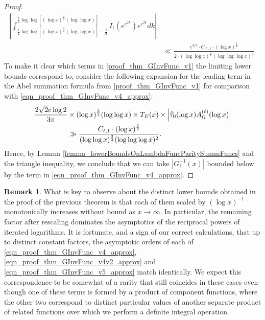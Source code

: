 \documentclass[11pt,reqno,a4letter]{article}
\numberwithin{figure}{section}
\numberwithin{table}{section}
\theoremstyle{plain}
\numberwithin{theorem}{section}
\theoremstyle{definition}
\newtheorem{remark}[theorem]{Remark}
\begin{document}
\begin{proof}
\begin{align}
     \left\lvert 
     \int_{\frac{1}{2} \log\log\left[(\log x)^{\frac{3}{2}} (\log\log x)\right] - 
     \frac{1}{2}}^{\frac{1}{2} \log\log\left[(\log x)^{\frac{3}{2}} (\log\log x)\right]} 
     I_{\ell}\left(e^{e^{2k}}\right) 
     e^{e^{2k}} dk \right\rvert \\ 
\label{eqn_proof_thm_GInvFunc_v4v2_approx} 
     & \ll 
     \frac{e^{3/4} \cdot C_{\ell,1} \cdot (\log x)^{\frac{3}{2}}}{2 \cdot  
     (\log\log x)^{\frac{3}{4}} (\log\log\log x)^2}. 
\end{align} 
To make it clear which terms in \eqref{proof_thm_GInvFunc_v1} 
the limiting lower bounds correspond to, consider the following expansion for the leading term in 
the Abel summation formula from \eqref{proof_thm_GInvFunc_v1} for comparison with 
\eqref{eqn_proof_thm_GInvFunc_v4_approx}: 
\begin{align} 
\notag 
\frac{2\sqrt{2} e \log 2}{3\pi} & \times (\log x)^{\frac{3}{2}} (\log\log x) \times T_E(x) \times 
     \left\lvert \widehat{\tau}_0(\log x) A_{\Omega}^{(\ell)}(\log x) \right\rvert \\ 
\label{eqn_proof_thm_GInvFunc_v5_approx} 
     & \gg \frac{C_{\ell,1} \cdot (\log x)^{\frac{3}{2}}}{ 
     (\log\log x)^{\frac{3}{4}} (\log\log\log x)^2}. 
\end{align} 
Hence, by 
Lemma \ref{lemma_lowerBoundsOnLambdaFuncParitySummFuncs} and the triangle inequality, 
we conclude that we can take $\left\lvert G_{\ell}^{-1}\left(x\right) \right\rvert$ 
bounded below by the term in 
\eqref{eqn_proof_thm_GInvFunc_v4_approx}. 
\end{proof} 

\begin{remark} 
What is key to observe about the distinct lower bounds obtained in the proof of the 
previous theorem 
is that each of them scaled by $(\log x)^{-1}$ 
monotonically increases without bound as $x \rightarrow \infty$. In particular, the remaining factor 
after rescaling dominates the asymptotics of the reciprocal powers of iterated logarithms. 
It is fortunate, and a sign of our correct calculations, that up to distinct constant factors, the 
asymptotic orders of each of 
\eqref{eqn_proof_thm_GInvFunc_v4_approx}, 
\eqref{eqn_proof_thm_GInvFunc_v4v2_approx} and 
\eqref{eqn_proof_thm_GInvFunc_v5_approx} 
match identically. We expect this correspondence to be somewhat of a rarity that still 
coincides in these cases even though one of these terms 
is formed by a product of component functions, where the other two correspond to 
distinct particular values of another separate product of related functions over 
which we perform a definite integral operation. 
\end{remark} 
\end{document}
